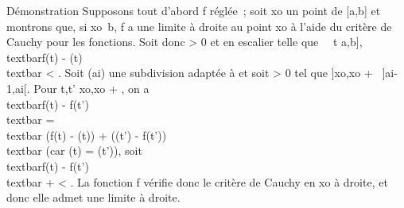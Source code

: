 Démonstration Supposons tout d'abord f réglée~; soit xo un
point de {[}a,b{]} et montrons que, si
xo\neq~b, f a une limite à droite au
point xo à l'aide du critère de Cauchy pour les fonctions.
Soit donc \epsilon \textgreater{} 0 et \phi en escalier telle que
\forall~~t \in {[}a,b{]}, \\textbar{}f(t)
- \phi(t)\\textbar{} \textless{} \epsilon {} . Soit (ai) une subdivision adaptée à \phi et soit \eta
\textgreater{} 0 tel que {]}xo,xo +
\eta{[}\subset~{]}ai-1,ai{[}. Pour t,t'
\in{]}xo,xo + \eta{[}, on a
\\textbar{}f(t) - f(t')\\textbar{}
=\\textbar{} (f(t) - \phi(t)) + (\phi(t') -
f(t'))\\textbar{} (car \phi(t) = \phi(t')), soit
\\textbar{}f(t) - f(t')\\textbar{} \leq \epsilon
{} + \epsilon {} \textless{} \epsilon.
La fonction f vérifie donc le critère de Cauchy en xo à
droite, et donc elle admet une limite à droite.

